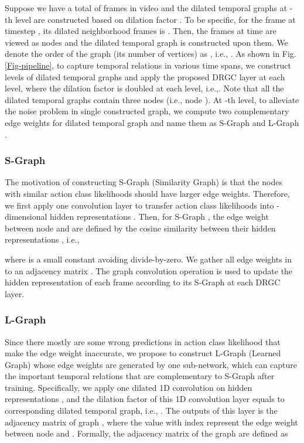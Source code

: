 \documentclass[letterpaper]{article} \usepackage{aaai21}  \usepackage{times}  \usepackage{helvet} \usepackage{courier}  \usepackage[hyphens]{url}  \usepackage{graphicx} \usepackage{mathtools}
\begin{document}
Suppose we have a total of  frames in video and the dilated temporal graphs at -th level are constructed based on dilation factor . To be specific, for the frame at timestep , its dilated neighborhood frames is . Then, the frames at time  are viewed as nodes and the dilated temporal graph  is constructed upon them. We denote the order of the graph (its number of vertices) as , i.e., . As shown in Fig. \ref{Fig-pipeline}, to capture temporal relations in various time spans, we construct  levels of dilated temporal graphs and apply the proposed DRGC layer at each level, where the dilation factor  is doubled at each level, i.e.,. Note that all the dilated temporal graphs contain three nodes (i.e., node ). At -th level, to alleviate the noise problem in single constructed graph, we compute two complementary edge weights for dilated temporal graph  and name them as S-Graph  and L-Graph .

\subsubsection{S-Graph}
The motivation of constructing S-Graph (Similarity Graph)  is that the nodes with similar action class likelihoods  should have larger edge weights. Therefore, we first apply one  convolution layer to transfer action class likelihoods  into -dimensional hidden representations . Then, for S-Graph , the edge weight  between node  and  are defined by the cosine similarity between their hidden representations , i.e.,

where  is a small constant avoiding divide-by-zero. We gather all edge weights in  to an adjacency matrix . The graph convolution operation is used to update the hidden representation  of each frame according to its S-Graph  at each DRGC layer.

\subsubsection{L-Graph}
Since there mostly are some wrong predictions in action class likelihood  that make the edge weight  inaccurate, we propose to construct L-Graph (Learned Graph)  whose edge weights are generated by one sub-network, which can capture the important temporal relations that are complementary to S-Graph after training. Specifically, we apply one dilated 1D convolution on hidden representations , and the dilation factor of this 1D convolution layer equals to corresponding dilated temporal graph, i.e., . The outputs of this layer is the adjacency matrix of graph , where the value with index  represent the edge weight between node  and . Formally, the adjacency matrix  of the graph  are defined as
\end{document}
